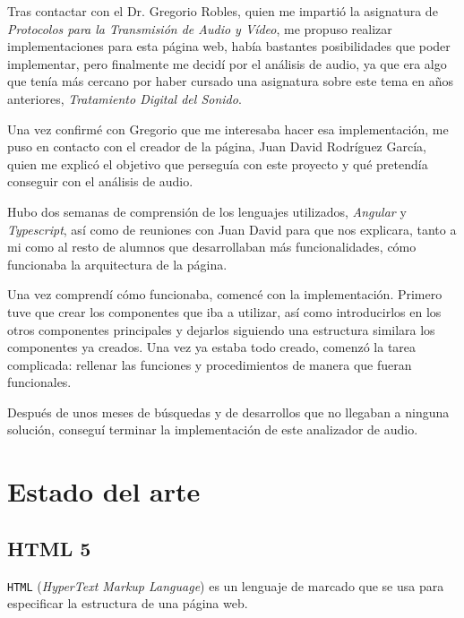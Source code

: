 \documentclass[a4paper, 12pt]{book}
\begin{document}
Tras contactar con el Dr. Gregorio Robles, quien me impartió la asignatura de \textit{Protocolos para la Transmisión de Audio y Vídeo}, me propuso realizar implementaciones para esta página web, había bastantes posibilidades que poder implementar, pero finalmente me decidí por el análisis de audio, ya que era algo que tenía más cercano por haber cursado una asignatura sobre este tema en años anteriores, \textit{Tratamiento Digital del Sonido}.

Una vez confirmé con Gregorio que me interesaba hacer esa implementación, me puso en contacto con el creador de la página, Juan David Rodríguez García, quien me explicó el objetivo que perseguía con este proyecto y qué pretendía conseguir con el análisis de audio.

Hubo dos semanas de comprensión de los lenguajes utilizados, \textit{Angular} y \textit{Typescript}, así como de reuniones con Juan David para que nos explicara, tanto a mi como al resto de alumnos que desarrollaban más funcionalidades, cómo funcionaba la arquitectura de la página.

Una vez comprendí cómo funcionaba, comencé con la implementación. Primero tuve que crear los componentes que iba a utilizar, así como introducirlos en los otros componentes principales y dejarlos siguiendo una estructura similara los componentes ya creados. Una vez ya estaba todo creado, comenzó la tarea complicada: rellenar las funciones y procedimientos de manera que fueran funcionales.

Después de unos meses de búsquedas y de desarrollos que no llegaban a ninguna solución, conseguí terminar la implementación de este analizador de audio.



\cleardoublepage
\chapter{Estado del arte}
\label{chap:estado}

\section{HTML 5} 
\label{sec:html5}

\texttt{HTML} (\textit{HyperText Markup Language})\cite{mdnhtml} es un lenguaje de marcado que se usa para especificar la estructura de una página web.
\end{document}
